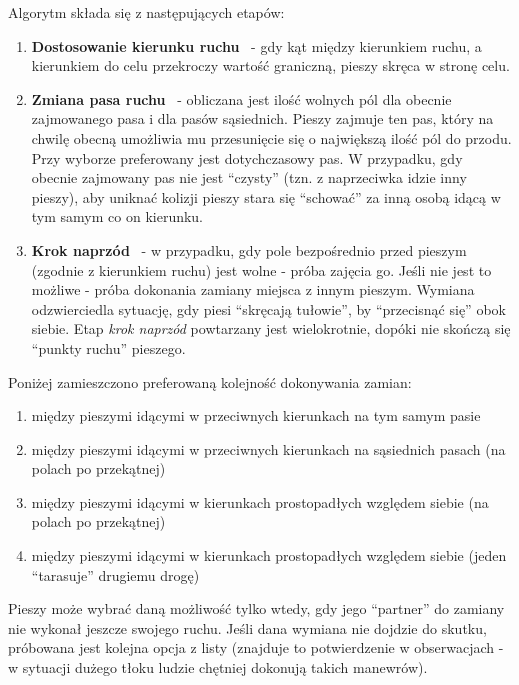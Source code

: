 \documentclass[a4paper, 12pt]{article}
\begin{document}
\noindent
Algorytm składa się z następujących etapów:
\begin{enumerate}
\item \textbf{Dostosowanie kierunku ruchu} \
    - gdy kąt między kierunkiem ruchu, a kierunkiem do celu przekroczy wartość graniczną, pieszy skręca w stronę celu.
\item \textbf{Zmiana pasa ruchu} \
    - obliczana jest ilość wolnych pól dla obecnie zajmowanego pasa i dla pasów sąsiednich. Pieszy zajmuje ten pas, który na chwilę obecną umożliwia mu przesunięcie się o największą ilość pól do przodu. Przy wyborze preferowany jest dotychczasowy pas. W przypadku, gdy obecnie zajmowany pas nie jest ``czysty'' (tzn. z naprzeciwka idzie inny pieszy), aby uniknać kolizji pieszy stara się ``schować'' za inną osobą idącą w tym samym co on kierunku.
\item \textbf{Krok naprzód} \
    - w przypadku, gdy pole bezpośrednio przed pieszym (zgodnie z kierunkiem ruchu) jest wolne - próba zajęcia go. Jeśli nie jest to możliwe - próba dokonania zamiany miejsca z innym pieszym. Wymiana odzwierciedla sytuację, gdy piesi ``skręcają tułowie'', by ``przecisnąć się'' obok siebie. Etap \textit{krok naprzód} powtarzany jest wielokrotnie, dopóki nie skończą się ``punkty ruchu'' pieszego.
\end{enumerate}

\newpage
\noindent
Poniżej zamieszczono preferowaną kolejność dokonywania zamian:

\begin{enumerate}
\item między pieszymi idącymi w przeciwnych kierunkach na tym samym pasie
\item między pieszymi idącymi w przeciwnych kierunkach na sąsiednich pasach (na polach po przekątnej)
\item między pieszymi idącymi w kierunkach prostopadłych względem siebie (na polach po przekątnej)
\item między pieszymi idącymi w kierunkach prostopadłych względem siebie (jeden ``tarasuje'' drugiemu drogę)
\end{enumerate}

\noindent
Pieszy może wybrać daną możliwość tylko wtedy, gdy jego ``partner'' do zamiany nie wykonał jeszcze swojego ruchu. Jeśli dana wymiana nie dojdzie do skutku, próbowana jest kolejna opcja z listy (znajduje to potwierdzenie w obserwacjach - w sytuacji dużego tłoku ludzie chętniej dokonują takich manewrów). \\
\end{document}
